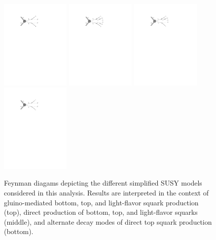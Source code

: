 \begin{figure}
	\includegraphics[width=0.30\textwidth]{results/figs/T2qq}
	\includegraphics[width=0.30\textwidth]{results/figs/T2bw}
	\includegraphics[width=0.30\textwidth]{results/figs/T2tb}
	\includegraphics[width=0.30\textwidth]{results/figs/T2cc}
	\caption{Feynman diagams depicting the different simplified SUSY models considered in this analysis. Results are interpreted in the context of gluino-mediated bottom, top, and light-flavor squark production (top), direct production of bottom, top, and light-flavor squarks (middle), and alternate decay modes of direct top squark production (bottom).}
	\label{fig:signalFeynman}
\end{figure}

